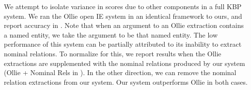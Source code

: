 We attempt to isolate variance in scores due to other components in a full
  KBP system.
We ran the Ollie open IE system \cite{key:2012mausam-ollie} in an identical
  framework to ours, and report accuracy in .
Note that when an argument to an Ollie extraction contains a named entity, 
  we take the argument to be that named entity.
The low performance of this system can be partially attributed to its inability
  to extract nominal relations.
To normalize for this, we report results when the Ollie extractions are
  supplemented with the nominal relations produced by our system
  (Ollie + Nominal Rels in ).
In the other direction, we can remove the nominal relation extractions from
  our system.
Our system outperforms Ollie in both cases.


%

